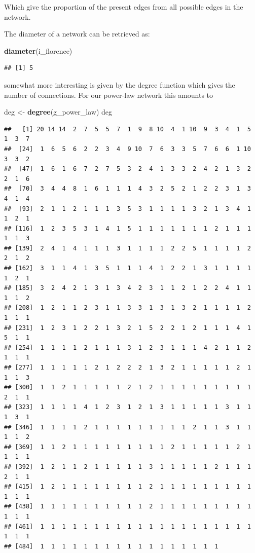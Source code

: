 \documentclass[]{article}
\newenvironment{Shaded}{\begin{snugshade}}{\end{snugshade}}
\newcommand{\KeywordTok}[1]{\textcolor[rgb]{0.13,0.29,0.53}{\textbf{#1}}}
\newcommand{\StringTok}[1]{\textcolor[rgb]{0.31,0.60,0.02}{#1}}
\newcommand{\NormalTok}[1]{#1}
\theoremstyle{definition}
\theoremstyle{definition}
\theoremstyle{definition}
\theoremstyle{remark}
\begin{document}
Which give the proportion of the present edges from all possible edges
in the network.

The diameter of a network can be retrieved as:

\begin{Shaded}
\begin{Highlighting}[]
\KeywordTok{diameter}\NormalTok{(i_florence)}
\end{Highlighting}
\end{Shaded}

\begin{verbatim}
## [1] 5
\end{verbatim}

somewhat more interesting is given by the degree function which gives
the number of connections. For our power-law network this amounts to

\begin{Shaded}
\begin{Highlighting}[]
\NormalTok{ deg <-}\StringTok{ }\KeywordTok{degree}\NormalTok{(g_power_law)}
\NormalTok{ deg}
\end{Highlighting}
\end{Shaded}

\begin{verbatim}
##   [1] 20 14 14  2  7  5  5  7  1  9  8 10  4  1 10  9  3  4  1  5  1  3  7
##  [24]  1  6  5  6  2  2  3  4  9 10  7  6  3  3  5  7  6  6  1 10  3  3  2
##  [47]  1  6  1  6  7  2  7  5  3  2  4  1  3  3  2  4  2  1  3  2  2  1  6
##  [70]  3  4  4  8  1  6  1  1  1  4  3  2  5  2  1  2  2  3  1  3  4  1  4
##  [93]  2  1  1  2  1  1  1  3  5  3  1  1  1  1  3  2  1  3  4  1  1  2  1
## [116]  1  2  3  5  3  1  4  1  5  1  1  1  1  1  1  1  2  1  1  1  1  1  3
## [139]  2  4  1  4  1  1  1  3  1  1  1  1  2  2  5  1  1  1  1  2  2  1  2
## [162]  3  1  1  4  1  3  5  1  1  1  4  1  2  2  1  3  1  1  1  1  1  2  1
## [185]  3  2  4  2  1  3  1  3  4  2  3  1  1  2  1  2  2  4  1  1  1  1  2
## [208]  1  2  1  1  2  3  1  1  3  3  1  3  1  3  2  1  1  1  1  2  1  1  1
## [231]  1  2  3  1  2  2  1  3  2  1  5  2  2  1  2  1  1  1  4  1  5  1  1
## [254]  1  1  1  1  2  1  1  1  3  1  2  3  1  1  1  4  2  1  1  2  1  1  1
## [277]  1  1  1  1  1  2  1  2  2  2  1  3  2  1  1  1  1  1  2  1  1  1  3
## [300]  1  1  2  1  1  1  1  1  2  1  2  1  1  1  1  1  1  1  1  1  2  1  1
## [323]  1  1  1  1  4  1  2  3  1  2  1  3  1  1  1  1  1  3  1  1  1  3  1
## [346]  1  1  1  1  2  1  1  1  1  1  1  1  1  1  2  1  1  3  1  1  1  1  2
## [369]  1  1  2  1  1  1  1  1  1  1  1  1  2  1  1  1  1  1  2  1  1  1  1
## [392]  1  2  1  1  2  1  1  1  1  1  3  1  1  1  1  1  2  1  1  1  2  1  1
## [415]  1  2  1  1  1  1  1  1  1  1  2  1  1  1  1  1  1  1  1  1  1  1  1
## [438]  1  1  1  1  1  1  1  1  1  1  2  1  1  1  1  1  1  1  1  1  1  1  1
## [461]  1  1  1  1  1  1  1  1  1  1  1  1  1  1  1  1  1  1  1  1  1  1  1
## [484]  1  1  1  1  1  1  1  1  1  1  1  1  1  1  1  1  1
\end{verbatim}
\end{document}
